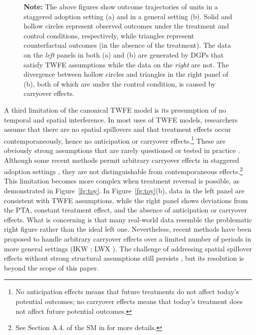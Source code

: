 \documentclass[12pt]{article}
\begin{document}
\begin{figure}[!ht]
\begin{minipage}{1\linewidth}
{}
\footnotesize\textbf{Note:} The above figures show outcome trajectories of units in a staggered adoption setting (a) and in a general setting (b). Solid and hollow circles represent observed outcomes under the treatment and control conditions, respectively, while triangles represent counterfactual outcomes (in the absence of the treatment). The data on the \emph{left} panels in both  (a) and (b) are generated by DGPs that satisfy TWFE assumptions while the data on the \emph{right} are not. The divergence between hollow circles and triangles in the right panel of (b), both of which are under the control condition, is caused by carryover effects. 
\end{minipage}\vspace{-0.5em}
\end{figure}

A third limitation of the canonical TWFE model is its presumption of no temporal and spatial interference. In most uses of TWFE models, researchers assume that there are no spatial spillovers and that treatment effects occur contemporaneously, hence no anticipation or carryover effects.\footnote{No anticipation effects means that future treatments do not affect today's potential outcomes; no carryover effects means that today's treatment does not affect future potential outcomes.} These are obviously strong assumptions that are rarely questioned or tested in practice \citep{Imai2019-nw, Athey2018-re, Wang2021-xo}. Although some recent methods permit arbitrary carryover effects in staggered adoption settings \citep{Strezhnev2018-ku, callaway2021-did}, they are not distinguishable from contemporaneous effects.\footnote{See Section A.4. of the SM in \citet{LWX2022} for more details.} This limitation becomes more complex when treatment reversal is possible, as demonstrated in Figure~\ref{fg:toy}. In Figure~\ref{fg:toy}(b), data in the left panel are consistent with TWFE assumptions, while the right panel shows deviations from the PTA, constant treatment effect, and the absence of anticipation or carryover effects. What is concerning is that many real-world data resemble the problematic right figure rather than the ideal left one. Nevertheless, recent methods have been proposed to handle arbitrary carryover effects over a limited number of periods in more general settings (IKW \citeyear{IKW2021}; LWX \citeyear{LWX2022}). The challenge of addressing spatial spillover effects without strong structural assumptions still persists \citep{Aronow2020-jc, Wang2021-xo}, but its resolution is beyond the scope of this paper.  
\end{document}
